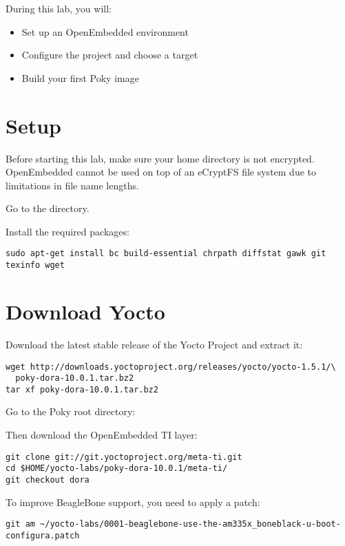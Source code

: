 
During this lab, you will:
\begin{itemize}
  \item Set up an OpenEmbedded environment
  \item Configure the project and choose a target
  \item Build your first Poky image
\end{itemize}

\section{Setup}

Before starting this lab, make sure your home directory is not
encrypted. OpenEmbedded cannot be used on top of an eCryptFS file
system due to limitations in file name lengths.

Go to the  directory.

Install the required packages:
\begin{verbatim}
sudo apt-get install bc build-essential chrpath diffstat gawk git texinfo wget
\end{verbatim}

\section{Download Yocto}

Download the latest stable release of the Yocto Project and extract it:
\begin{verbatim}
wget http://downloads.yoctoproject.org/releases/yocto/yocto-1.5.1/\
  poky-dora-10.0.1.tar.bz2
tar xf poky-dora-10.0.1.tar.bz2
\end{verbatim}

Go to the Poky root directory: 

Then download the OpenEmbedded TI layer:
\begin{verbatim}
git clone git://git.yoctoproject.org/meta-ti.git
cd $HOME/yocto-labs/poky-dora-10.0.1/meta-ti/
git checkout dora
\end{verbatim}

To improve BeagleBone support, you need to apply a patch:
\begin{verbatim}
git am ~/yocto-labs/0001-beaglebone-use-the-am335x_boneblack-u-boot-configura.patch
\end{verbatim}

